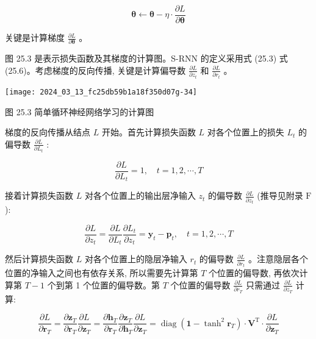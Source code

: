 \documentclass[10pt]{article}
\begin{document}
\begin{equation*}
\boldsymbol{\theta} \leftarrow \boldsymbol{\theta}-\eta \cdot \frac{\partial L}{\partial \boldsymbol{\theta}} \tag{25.9}
\end{equation*}


关键是计算梯度 $\frac{\partial L}{\partial \boldsymbol{\theta}}$ 。

图 25.3 是表示损失函数及其梯度的计算图。S-RNN 的定义采用式 (25.3) 式 (25.6)。考虑梯度的反向传播, 关键是计算偏导数 $\frac{\partial L}{\partial z_{t}}$ 和 $\frac{\partial L}{\partial r_{t}}$ 。

\begin{center}
\texttt{[image: 2024\_03\_13\_fc25db59b1a18f350d07g-34]}
\end{center}

图 25.3 简单循环神经网络学习的计算图

梯度的反向传播从结点 $L$ 开始。首先计算损失函数 $L$ 对各个位置上的损失 $L_{t}$ 的偏导数 $\frac{\partial L}{\partial L_{t}}$ :


\begin{equation*}
\frac{\partial L}{\partial L_{t}}=1, \quad t=1,2, \cdots, T \tag{25.10}
\end{equation*}


接着计算损失函数 $L$ 对各个位置上的输出层净输入 $z_{t}$ 的偏导数 $\frac{\partial L}{\partial z_{t}}$ (推导见附录 $\mathrm{F}$ ):


\begin{equation*}
\frac{\partial L}{\partial z_{t}}=\frac{\partial L}{\partial L_{t}} \frac{\partial L_{t}}{\partial z_{t}}=\boldsymbol{y}_{t}-\boldsymbol{p}_{t}, \quad t=1,2, \cdots, T \tag{25.11}
\end{equation*}


然后计算损失函数 $L$ 对各个位置上的隐层净输入 $r_{t}$ 的偏导数 $\frac{\partial L}{\partial r_{t}}$ 。注意隐层各个位置的净输入之间也有依存关系, 所以需要先计算第 $T$ 个位置的偏导数, 再依次计算第 $T-1$ 个到第 1 个位置的偏导数。第 $T$ 个位置的偏导数 $\frac{\partial L}{\partial r_{T}}$ 只需通过 $\frac{\partial L}{\partial z_{T}}$ 计算:


\begin{equation*}
\frac{\partial L}{\partial \boldsymbol{r}_{T}}=\frac{\partial \boldsymbol{z}_{T}}{\partial \boldsymbol{r}_{T}} \frac{\partial L}{\partial \boldsymbol{z}_{T}}=\frac{\partial \boldsymbol{h}_{T}}{\partial \boldsymbol{r}_{T}} \frac{\partial \boldsymbol{z}_{T}}{\partial \boldsymbol{h}_{T}} \frac{\partial L}{\partial \boldsymbol{z}_{T}}=\operatorname{diag}\left(\boldsymbol{1}-\tanh ^{2} \boldsymbol{r}_{T}\right) \cdot \boldsymbol{V}^{\mathrm{T}} \cdot \frac{\partial L}{\partial \boldsymbol{z}_{T}} \tag{25.12}
\end{equation*}
\end{document}
